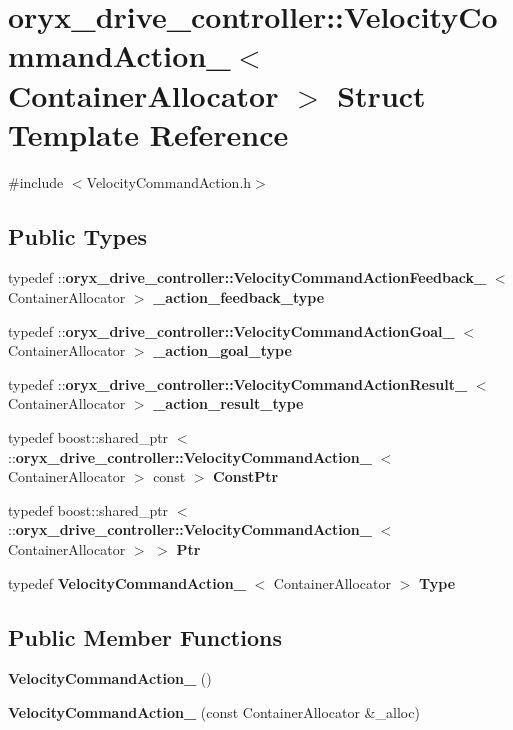\section{oryx\-\_\-drive\-\_\-controller\-:\-:\-Velocity\-Command\-Action\-\_\-$<$ \-Container\-Allocator $>$ \-Struct \-Template \-Reference}
\label{structoryx__drive__controller_1_1VelocityCommandAction__}


{\ttfamily \#include $<$\-Velocity\-Command\-Action.\-h$>$}

\subsection*{\-Public \-Types}
\begin{DoxyCompactItemize}
\item 
typedef \*
\-::{\bf oryx\-\_\-drive\-\_\-controller\-::\-Velocity\-Command\-Action\-Feedback\-\_\-}\*
$<$ \-Container\-Allocator $>$ {\bf \-\_\-action\-\_\-feedback\-\_\-type}
\item 
typedef \*
\-::{\bf oryx\-\_\-drive\-\_\-controller\-::\-Velocity\-Command\-Action\-Goal\-\_\-}\*
$<$ \-Container\-Allocator $>$ {\bf \-\_\-action\-\_\-goal\-\_\-type}
\item 
typedef \*
\-::{\bf oryx\-\_\-drive\-\_\-controller\-::\-Velocity\-Command\-Action\-Result\-\_\-}\*
$<$ \-Container\-Allocator $>$ {\bf \-\_\-action\-\_\-result\-\_\-type}
\item 
typedef boost\-::shared\-\_\-ptr\*
$<$ \-::{\bf oryx\-\_\-drive\-\_\-controller\-::\-Velocity\-Command\-Action\-\_\-}\*
$<$ \-Container\-Allocator $>$ const  $>$ {\bf \-Const\-Ptr}
\item 
typedef boost\-::shared\-\_\-ptr\*
$<$ \-::{\bf oryx\-\_\-drive\-\_\-controller\-::\-Velocity\-Command\-Action\-\_\-}\*
$<$ \-Container\-Allocator $>$ $>$ {\bf \-Ptr}
\item 
typedef {\bf \-Velocity\-Command\-Action\-\_\-}\*
$<$ \-Container\-Allocator $>$ {\bf \-Type}
\end{DoxyCompactItemize}
\subsection*{\-Public \-Member \-Functions}
\begin{DoxyCompactItemize}
\item 
{\bf \-Velocity\-Command\-Action\-\_\-} ()
\item 
{\bf \-Velocity\-Command\-Action\-\_\-} (const \-Container\-Allocator \&\-\_\-alloc)
\end{DoxyCompactItemize}

